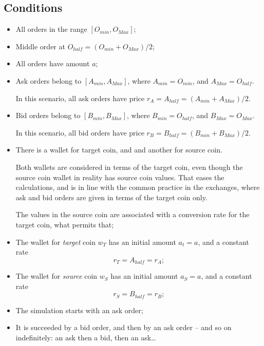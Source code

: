 \documentclass[a4paper,11pt]{article}
\begin{document}
\subsection{Conditions}
\begin{itemize}
    \item All orders in the range $[ O_{min}, O_{Max}]$;
    \item Middle order at $O_{half} = (O_{min} + O_{Max}) / 2$;
    \item All orders have amount $a$;
    \item Ask orders belong to $[ A_{min}, A_{Max}]$, where 
        $A_{min} = O_{min}$, and $A_{Max} = O_{half}$. 

        In this scenario, all ask orders have price 
        $r_A = A_{half} = (A_{min} + A_{Max}) / 2$.
    \item Bid orders belong to $[ B_{min}, B_{Max}]$, where 
        $B_{min} = O_{half}$, and $B_{Max} = O_{Max}$. 

        In this scenario, all bid orders have price 
        $r_B = B_{half} = (B_{min} + B_{Max}) / 2$.
    \item There is a wallet for target coin, and and another for source coin. 
	
	Both wallets are considered in terms of the target coin, even though the source coin
	wallet in reality has source coin values. That eases the calculations, and is in line with 
	the common practice in the exchanges, where ask and bid orders are given in terms of the 
	target coin only.
	
	The values in the source coin are associated with a conversion rate for the target coin, 
	what permits that;
	
    \item The wallet for {\em target} coin $w_T$ has an initial amount $a_t = a$, and 
        a constant rate 
        \begin{equation*}
	    r_T = A_{half}= r_A; 
        \end{equation*}
        
    \item The wallet for {\em source} coin $w_S$ has an initial amount $a_S = a$, and 
        a constant rate
        \begin{equation*}
	    r_S = B_{half} = r_B; 
        \end{equation*}

    \item The simulation starts with an ask order;
    \item It is succeeded by a bid order, and then by an ask order -- and so
	on indefinitely: an ask then a bid, then an 
ask\ldots{}
\end{itemize}
\end{document}
